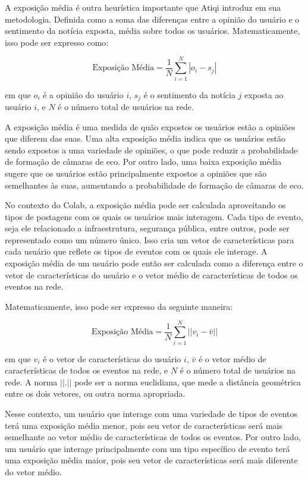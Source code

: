 A exposição média é outra heurística importante que Atiqi introduz em sua metodologia. Definida como a soma das diferenças entre a opinião do usuário e o sentimento da notícia exposta, média sobre todos os usuários. Matematicamente, isso pode ser expresso como:

\begin{equation}
	\text{{Exposição Média}} = \frac{1}{N} \sum_{i=1}^{N} |o_i - s_j|
\end{equation}

em que $o_i$ é a opinião do usuário $i$, $s_j$ é o sentimento da notícia $j$ exposta ao usuário $i$, e $N$ é o número total de usuários na rede.

A exposição média é uma medida de quão expostos os usuários estão a opiniões que diferem das suas. Uma alta exposição média indica que os usuários estão sendo expostos a uma variedade de opiniões, o que pode reduzir a probabilidade de formação de câmaras de eco. Por outro lado, uma baixa exposição média sugere que os usuários estão principalmente expostos a opiniões que são semelhantes às suas, aumentando a probabilidade de formação de câmaras de eco.

No contexto do Colab, a exposição média pode ser calculada aproveitando os tipos de postagens com os quais os usuários mais interagem. Cada tipo de evento, seja ele relacionado a infraestrutura, segurança pública, entre outros, pode ser representado como um número único. Isso cria um vetor de características para cada usuário que reflete os tipos de eventos com os quais ele interage. A exposição média de um usuário pode então ser calculada como a diferença entre o vetor de características do usuário e o vetor médio de características de todos os eventos na rede.

Matematicamente, isso pode ser expresso da seguinte maneira:

\begin{equation}
	\text{{Exposição Média}} = \frac{1}{N} \sum_{i=1}^{N} ||v_i - \bar{v}||
\end{equation}

em que $v_i$ é o vetor de características do usuário $i$, $\bar{v}$ é o vetor médio de características de todos os eventos na rede, e $N$ é o número total de usuários na rede. A norma $||.||$ pode ser a norma euclidiana, que mede a distância geométrica entre os dois vetores, ou outra norma apropriada.

Nesse contexto, um usuário que interage com uma variedade de tipos de eventos terá uma exposição média menor, pois seu vetor de características será mais semelhante ao vetor médio de características de todos os eventos. Por outro lado, um usuário que interage principalmente com um tipo específico de evento terá uma exposição média maior, pois seu vetor de características será mais diferente do vetor médio.

